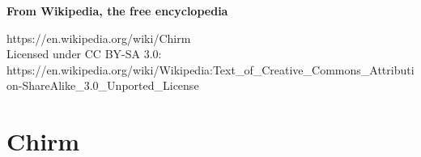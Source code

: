 \textbf{From Wikipedia, the free encyclopedia}

https://en.wikipedia.org/wiki/Chirm\\
Licensed under CC BY-SA 3.0:\\
https://en.wikipedia.org/wiki/Wikipedia:Text\_of\_Creative\_Commons\_Attribution-ShareAlike\_3.0\_Unported\_License

\section{Chirm}\label{chirm}
